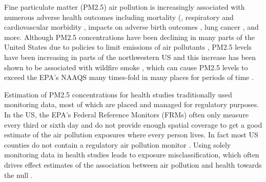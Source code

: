 \documentclass[english]{article}
\begin{document}

Fine particulate matter (PM2.5) air pollution is increasingly associated with numerous adverse health outcomes including mortality (\cite{achilleos_acute_2017}, respiratory and cardiovascular morbidity \cite{xing_impact_2016, rajagopalan_air_2018}, impacts on adverse birth outcomes \cite{klepac_ambient_2018}, lung cancer \cite{hamra_outdoor_2014}, and more. Although PM2.5 concentrations have been declining in many parts of the United States due to policies to limit emissions of air pollutants \cite{fann_estimated_2017}, PM2.5 levels have been increasing in parts of the northwestern US \cite{mcclure_US_2018} and this increase has been shown to be associated with wildfire smoke \cite{mcclure_US_2018, ODell_contribution_2019}, which can cause PM2.5 levels to exceed the EPA’s NAAQS many times-fold in many places for periods of time \cite{reid_associations_2019}. 

Estimation of PM2.5 concentrations for health studies traditionally used monitoring data, most of which are placed and managed for regulatory purposes. In the US, the EPA’s Federal Reference Monitors (FRMs) often only measure every third or sixth day and do not provide enough spatial coverage to get a good estimate of the air pollution exposures where every person lives. In fact most US counties do not contain a regulatory air pollution monitor \cite{brokamp_assessing_2019}. Using solely monitoring data in health studies leads to exposure misclassification, which often drives effect estimates of the association between air pollution and health towards the null \cite{zeger_exposure_2000}.
\end{document}
